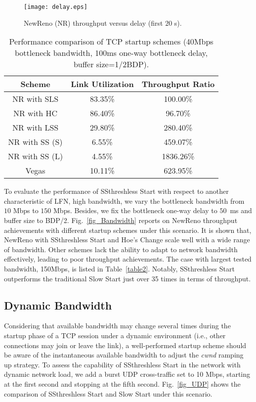 \documentclass[12pt,onecolumn]{IEEEtran}
\begin{document}
\begin{figure}
\centering
\texttt{[image: delay.eps]}
\caption{NewReno (NR) throughput versus delay (first $20$ s).}
\label{fig_Delay}
\end{figure}
\begin{table}[h]
\centering
\label{table3}\caption{\footnotesize Performance comparison of TCP startup schemes  (40Mbps bottleneck bandwidth, 100ms one-way bottleneck delay, buffer size=1/2BDP).} \begin{tabular}{|c|c|c|} \hline
Scheme & Link Utilization & Throughput Ratio\\ \hline \hline
NR with SLS & 83.35\%  &   100.00\% \\ \hline NR with HC & 86.40\%  &   96.70\%  \\ \hline
NR with LSS & 29.80\%  &   280.40\%  \\ \hline
NR with SS (S) &   6.55\% & 459.07\%  \\ \hline
NR with SS (L) & 4.55\%  &   1836.26\% \\ \hline
Vegas  & 10.11\%  &   623.95\% \\ \hline
\end{tabular}
\end{table}



To evaluate the performance of SSthreshless Start with respect to another
characteristic of LFN, high bandwidth, we vary the bottleneck bandwidth from
$10$ Mbps to $150$ Mbps. Besides, we fix the bottleneck one-way delay to
$50$~ms and buffer size to BDP/2. Fig.~\ref{fig_Bandwidth} reports on NewReno
throughput achievements with different startup schemes under this scenario. It
is shown that, NewReno with SSthreshless Start and Hoe's Change scale well with
a wide range of bandwidth. Other schemes lack the ability to adapt to network
bandwidth effectively, leading to poor throughput achievements. The case with
largest tested bandwidth, 150Mbps, is listed in Table~\ref{table2}. Notably,
SSthreshless Start outperforms the traditional Slow Start just over 35 times in
terms of throughput.





\subsection{Dynamic Bandwidth}
Considering that available bandwidth may change several times during the
startup phase of a TCP session under a dynamic environment (i.e., other
connections may join or leave the link), a well-performed startup scheme should
be aware of the instantaneous available bandwidth to adjust the \emph{cwnd}
ramping up strategy. To assess the capability of SSthreshless Start in the
network with dynamic network load, we add a burst UDP cross-traffic set to
10 Mbps, starting at the first second and stopping at the fifth second.
Fig.~\ref{fig_UDP} shows the comparison of SSthreshless Start and Slow Start
under this scenario.
\end{document}
